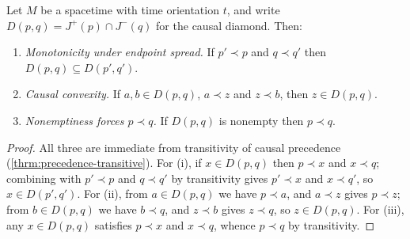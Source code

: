 \begin{lemma}
    \label{lmm:causal-diamond-structure}
    \leanok
    Let $M$ be a spacetime with time orientation $t$, and write $D(p,q) = J^+(p) \cap J^-(q)$ for the causal diamond. Then:
    \begin{enumerate}
        \item \textit{Monotonicity under endpoint spread.} If $p' \prec p$ and $q \prec q'$ then $D(p,q) \subseteq D(p',q')$.
        \item \textit{Causal convexity.} If $a, b \in D(p,q)$, $a \prec z$ and $z \prec b$, then $z \in D(p,q)$.
        \item \textit{Nonemptiness forces $p \prec q$.} If $D(p,q)$ is nonempty then $p \prec q$.
    \end{enumerate}
\end{lemma}
\begin{proof}
    \leanok
    All three are immediate from transitivity of causal precedence (\ref{thrm:precedence-transitive}). For (i), if $x \in D(p,q)$ then $p \prec x$ and $x \prec q$; combining with $p' \prec p$ and $q \prec q'$ by transitivity gives $p' \prec x$ and $x \prec q'$, so $x \in D(p',q')$. For (ii), from $a \in D(p,q)$ we have $p \prec a$, and $a \prec z$ gives $p \prec z$; from $b \in D(p,q)$ we have $b \prec q$, and $z \prec b$ gives $z \prec q$, so $z \in D(p,q)$. For (iii), any $x \in D(p,q)$ satisfies $p \prec x$ and $x \prec q$, whence $p \prec q$ by transitivity.
\end{proof}

